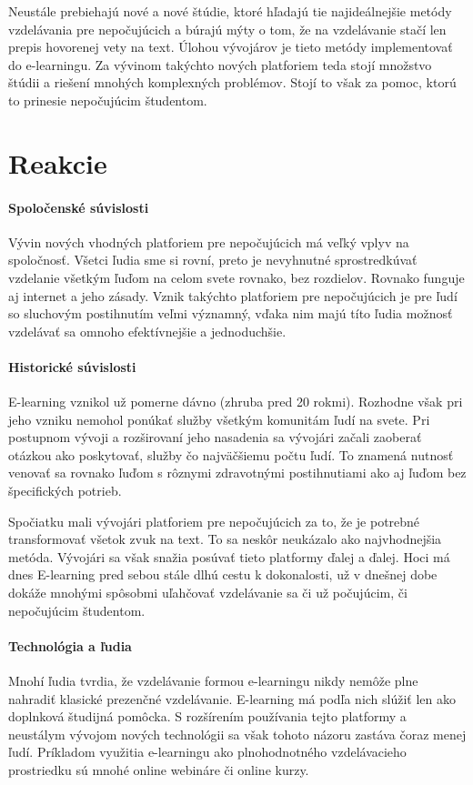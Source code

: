 \documentclass[10pt,oneside,slovak,a4paper]{article}
\begin{document}
Neustále prebiehajú nové a nové štúdie, ktoré hľadajú tie najideálnejšie metódy vzdelávania pre nepočujúcich a búrajú mýty o tom, že na vzdelávanie stačí len prepis hovorenej vety na text. Úlohou vývojárov je tieto metódy implementovať do e-learningu.  Za vývinom takýchto nových platforiem teda stojí množstvo štúdii a riešení mnohých komplexných problémov. Stojí to však za pomoc, ktorú to prinesie nepočujúcim študentom.
\section{Reakcie}
\paragraph{Spoločenské súvislosti} 
Vývin nových vhodných platforiem pre nepočujúcich má veľký vplyv na spoločnosť. Všetci ľudia sme si rovní, preto je nevyhnutné sprostredkúvať vzdelanie všetkým ľuďom na celom svete rovnako, bez rozdielov. Rovnako funguje aj internet a jeho zásady. Vznik takýchto platforiem pre nepočujúcich je pre ľudí so sluchovým postihnutím veľmi významný, vďaka nim majú títo ľudia možnosť vzdelávať sa omnoho efektívnejšie a jednoduchšie. 
\paragraph{Historické súvislosti} E-learning vznikol už pomerne dávno (zhruba pred 20 rokmi). Rozhodne však pri jeho vzniku nemohol ponúkať služby všetkým komunitám ľudí na svete. Pri postupnom vývoji a rozširovaní jeho nasadenia sa vývojári začali zaoberať otázkou ako poskytovať, služby čo najväčšiemu počtu ľudí. To znamená nutnosť venovať sa rovnako ľuďom s rôznymi zdravotnými postihnutiami ako aj ľuďom bez špecifických potrieb.

Spočiatku mali vývojári platforiem pre nepočujúcich za to, že je potrebné transformovať všetok zvuk na text. To sa neskôr neukázalo ako najvhodnejšia metóda. Vývojári sa však snažia posúvať tieto platformy ďalej a ďalej. Hoci má dnes E-learning pred sebou stále dlhú cestu k dokonalosti, už v dnešnej dobe dokáže mnohými spôsobmi uľahčovať vzdelávanie sa či už počujúcim, či nepočujúcim študentom.

\paragraph{Technológia a ľudia}
Mnohí ľudia tvrdia, že vzdelávanie formou e-learningu nikdy nemôže plne nahradiť klasické prezenčné vzdelávanie. E-learning má podľa nich slúžiť len ako doplnková študijná pomôcka. S rozšírením používania tejto platformy a neustálym vývojom nových technológii sa však tohoto názoru zastáva čoraz menej ľudí. Príkladom využitia e-learningu ako plnohodnotného vzdelávacieho prostriedku sú mnohé online webináre či online kurzy. 
\end{document}

